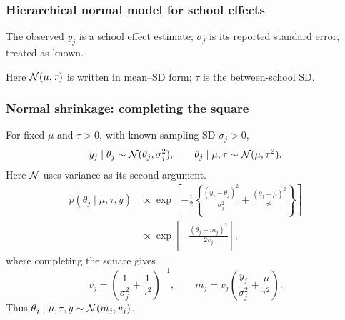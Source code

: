 \documentclass[10pt]{beamer}
\begin{document}
\begin{frame}

\frametitle{Hierarchical normal model for school effects}

    \begin{minipage}[b]{4cm}
      \begin{xy}
\end{xy}
\end{minipage}
  \medskip

  The observed $y_j$ is a school effect estimate;
  $\sigma_j$ is its reported standard error, treated as known.

  Here $\mathcal{N}(\mu,\tau)$ is written in mean--SD form;
  $\tau$ is the between-school SD.
\end{frame}

\begin{frame}
\frametitle{Normal shrinkage: completing the square}

  For fixed $\mu$ and $\tau>0$, with known sampling SD $\sigma_j>0$,
  \[
    y_j\mid\theta_j\sim\mathcal{N}(\theta_j,\sigma_j^2),\qquad
    \theta_j\mid\mu,\tau\sim\mathcal{N}(\mu,\tau^2).
  \]
  Here $\mathcal{N}$ uses variance as its second argument.
  \begin{align*}
    p(\theta_j\mid\mu,\tau,y)
      &\propto\exp\!\left[-\frac12\left\{
        \frac{(y_j-\theta_j)^2}{\sigma_j^2}
        +\frac{(\theta_j-\mu)^2}{\tau^2}\right\}\right]\\
      &\propto\exp\!\left[-\frac{(\theta_j-m_j)^2}{2v_j}\right],
  \end{align*}
  where completing the square gives
  \[
    v_j=\left(\frac{1}{\sigma_j^2}+\frac{1}{\tau^2}\right)^{-1},
    \qquad m_j=v_j\left(\frac{y_j}{\sigma_j^2}+\frac{\mu}{\tau^2}\right).
  \]
  Thus $\theta_j\mid\mu,\tau,y\sim\mathcal{N}(m_j,v_j)$.
\end{frame}
\end{document}
